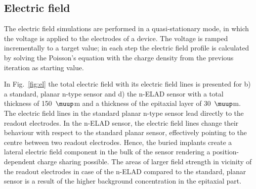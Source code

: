 \documentclass[a4paper,11pt]{article}
\begin{document}
\subsection{Electric field}
\label{sec:ef}
The electric field simulations are performed in a quasi-stationary mode, in which the voltage is applied to the electrodes of a device.
The voltage is ramped incrementally to a target value; in each step the electric field profile is calculated
 by solving the Poisson's equation with the charge density from the previous iteration as starting value.

In Fig.~\ref{fig:el} the total electric field with its electric field lines is presented for b) a standard, planar n-type sensor and d) the n-ELAD sensor
 with a total thickness of 150~$\muup$m and a thickness of the epitaxial layer of 30~$\muup$m.
The electric field lines in the standard planar n-type sensor lead directly to the readout electrodes. 
In the n-ELAD sensor, the electric field lines change their behaviour with respect to the standard planar sensor, effectively pointing to the centre between two readout electrodes. 
Hence, the buried implants create a lateral electric field component in the bulk of the sensor rendering a position-dependent charge sharing possible.
The areas of larger field strength in vicinity of the readout electrodes in case of the n-ELAD compared to the standard, planar sensor is a result of the higher background concentration in the epitaxial part. 
\end{document}
